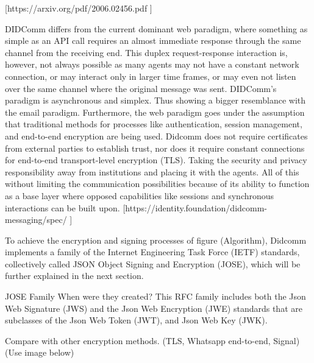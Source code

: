 [https://arxiv.org/pdf/2006.02456.pdf ]

DIDComm differs from the current dominant web paradigm, where something as simple as an API call requires an almost immediate response through the same channel from the receiving end. This duplex request-response interaction is, however, not always possible as many agents may not have a constant network connection, or may interact only in larger time frames, or may even not listen over the same channel where the original message was sent. DIDComm's paradigm is asynchronous and simplex. Thus showing a bigger resemblance with the email paradigm. Furthermore, the web paradigm goes under the assumption that traditional methods for processes like authentication, session management, and end-to-end encryption are being used. Didcomm does not require certificates from external parties to establish trust, nor does it require constant connections for end-to-end transport-level encryption (TLS). Taking the security and privacy responsibility away from institutions and placing it with the agents. All of this without limiting the communication possibilities because of its ability to function as a base layer where opposed capabilities like sessions and synchronous interactions can be built upon.  [https://identity.foundation/didcomm-messaging/spec/ ]

To achieve the encryption and signing processes of figure (Algorithm), Didcomm implements a family of the Internet Engineering Task Force (IETF) standards, collectively called JSON Object Signing and Encryption (JOSE), which will be further explained in the next section. 

JOSE Family
When were they created?
This RFC family includes both the Json Web Signature (JWS) and the Json Web Encryption (JWE) standards that are subclasses of the Json Web Token (JWT), and Json Web Key (JWK).



Compare with other encryption methods. (TLS, Whatsapp end-to-end, Signal) (Use image below)
 